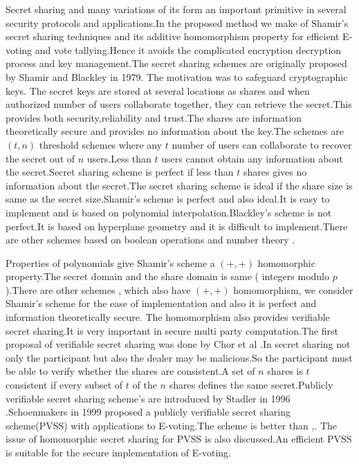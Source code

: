 \documentclass[conference]{IEEEtran}
\begin{document}
Secret sharing and many variations of its form an important primitive in several security protocols and applications.In the proposed method we make of Shamir's \cite{shamir1979} secret sharing techniques and its additive homomorphism property for efficient E-voting and vote tallying.Hence it avoids the complicated encryption decryption process and key management.The secret sharing schemes are originally proposed by Shamir \cite{shamir1979} and Blackley \cite{blakley1979} in 1979.
The motivation was to safeguard cryptographic keys.	The secret keys are stored at several locations as shares and when authorized number of users collaborate together, they can retrieve the secret.This provides both security,reliability and trust.The shares are information theoretically secure and provides no information about the key.The schemes are $(t,n)$ threshold schemes where any $t$ number of users can collaborate to recover the secret out of $n$ users.Less than $t$ users cannot obtain any information about the secret.Secret sharing scheme is perfect if less than $t$ shares gives no information about the secret.The secret sharing scheme is ideal if the share size is same as the secret size.Shamir's scheme is perfect and also ideal.It is easy to implement and is based on polynomial interpolation.Blackley's scheme is not perfect.It is based on hyperplane geometry and it is difficult to implement.There are other schemes based on boolean operations \cite{kuri2009xor} \cite{wang2007ssboln} and number theory \cite{mignotte1983} \cite{asmuth1983}.


Properties of polynomials give Shamir's scheme a $(+,+)$ homomorphic property.The secret domain and the share domain is same ( integers modulo $p$).There are other schemes \cite{asmuth1983modular},\cite{kothari1985generalized} which also have $(+,+)$ homomorphism, we consider Shamir's scheme for the ease of implementation and also it is perfect and information theoretically secure.
The homomorphism also provides verifiable secret sharing.It is very important in secure multi party computation.The first proposal of verifiable secret sharing was done by Chor et al \cite{chor1985verifiable}.In secret sharing not only the participant but also the dealer may be malicious.So the participant must be able to verify whether the shares are consistent.A set of $n$ shares is $t$ consistent if every subset of $t$ of the $n$ shares defines the same secret.Publicly verifiable secret sharing scheme's are introduced by Stadler in 1996 \cite{stadler1996publicly}.Schoenmakers \cite{schoenmakers1999simple} in 1999 proposed a publicly verifiable secret sharing scheme(PVSS) with applications to E-voting.The scheme is better than \cite{cramery1997secure},\cite{cohen1985robust}. The issue of homomorphic secret sharing for PVSS is also discussed.An efficient PVSS is suitable for the secure implementation of E-voting.
\end{document}
